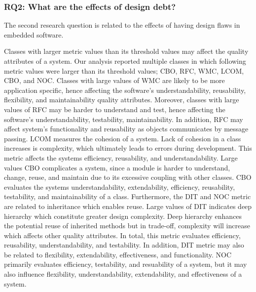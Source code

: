 

\subsubsection{RQ2: What are the effects of design debt?} 
The second research question is related to the effects of having design flaws in embedded software.

Classes with larger metric values than its threshold values may affect the quality attributes of a system. Our analysis reported multiple classes in which following metric values were larger than its threshold values; CBO, RFC, WMC, LCOM, CBO, and NOC. Classes with large values of WMC are likely to be more application specific, hence affecting the software's understandability, reusability, flexibility, and maintainability quality attributes\cite{rosenberg1998applying,bansiya2002hierarchical}. Moreover, classes with large values of RFC may be harder to understand and test, hence affecting the software's understandability, testability, maintainability\cite{rosenberg1998applying}. In addition, RFC may affect system's functionality and reusability as objects communicates by message passing\cite{bansiya2002hierarchical}. LCOM measures the cohesion of a system. Lack of cohesion in a class increases is complexity, which ultimately leads to errors during development. This metric affects the systems efficiency, reusability, and understandability\cite{rosenberg1998applying,bansiya2002hierarchical}. Large values CBO complicates a system, since a module is harder to understand, change, reuse, and maintain due to its excessive coupling with other classes. CBO evaluates the systems understandability, extendability, efficiency, reusability, testability, and maintainability of a class\cite{rosenberg1998applying,bansiya2002hierarchical}. Furthermore, the DIT and NOC metric are related to inheritance which enables reuse. Large values of DIT indicates deep hierarchy which constitute greater design complexity. Deep hierarchy enhances the potential reuse of inherited methods but in trade-off, complexity will increase which affects other quality attributes. In total, this metric evaluates efficiency, reusability, understandability, and testability\cite{rosenberg1998applying}. In addition, DIT metric may also be related to flexibility, extendability, effectiveness, and functionality\cite{bansiya2002hierarchical}. NOC primarily evaluates efficiency, testability, and resuability of a system\cite{rosenberg1998applying}, but it may also influence flexibility, understandability, extendability, and effectiveness of a system\cite{bansiya2002hierarchical}.

